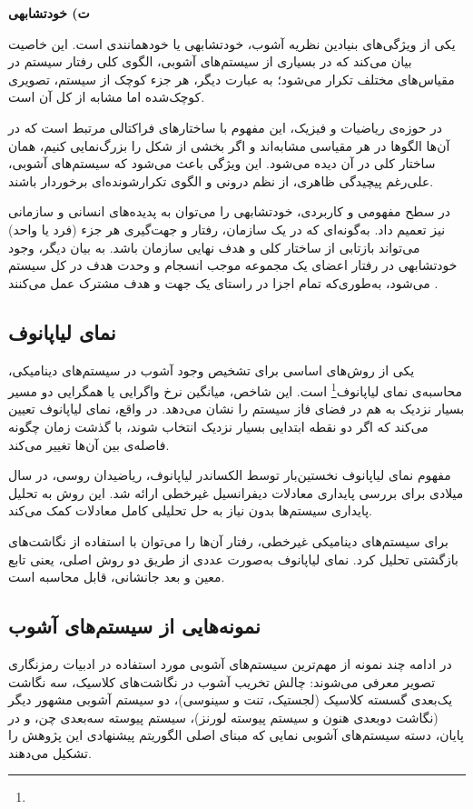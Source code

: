 \textbf{ت) خودتشابهی}

یکی از ویژگی‌های بنیادین نظریه آشوب، خودتشابهی یا خودهمانندی است. این خاصیت بیان می‌کند که در بسیاری از سیستم‌های آشوبی، الگوی کلی رفتار سیستم در مقیاس‌های مختلف تکرار می‌شود؛ به عبارت دیگر، هر جزء کوچک از سیستم، تصویری کوچک‌شده اما مشابه از کل آن است.

در حوزه‌ی ریاضیات و فیزیک، این مفهوم با ساختارهای فراکتالی مرتبط است که در آن‌ها الگوها در هر مقیاسی مشابه‌اند و اگر بخشی از شکل را بزرگ‌نمایی کنیم، همان ساختار کلی در آن دیده می‌شود. این ویژگی باعث می‌شود که سیستم‌های آشوبی، علی‌رغم پیچیدگی ظاهری، از نظم درونی و الگوی تکرارشونده‌ای برخوردار باشند.

در سطح مفهومی و کاربردی، خودتشابهی را می‌توان به پدیده‌های انسانی و سازمانی نیز تعمیم داد. به‌گونه‌ای که در یک سازمان، رفتار و جهت‌گیری هر جزء (فرد یا واحد) می‌تواند بازتابی از ساختار کلی و هدف نهایی سازمان باشد. به بیان دیگر، وجود خودتشابهی در رفتار اعضای یک مجموعه موجب انسجام و وحدت هدف در کل سیستم می‌شود، به‌طوری‌که تمام اجزا در راستای یک جهت و هدف مشترک عمل می‌کنند \cite{ref27}.

\subsection{نمای لیاپانوف}

یکی از روش‌های اساسی برای تشخیص وجود آشوب در سیستم‌های دینامیکی، محاسبه‌ی نمای لیاپانوف\footnote{} است. این شاخص، میانگین نرخ واگرایی یا همگرایی دو مسیر بسیار نزدیک به هم در فضای فاز سیستم را نشان می‌دهد. در واقع، نمای لیاپانوف تعیین می‌کند که اگر دو نقطه ابتدایی بسیار نزدیک انتخاب شوند، با گذشت زمان چگونه فاصله‌ی بین آن‌ها تغییر می‌کند.

مفهوم نمای لیاپانوف نخستین‌بار توسط الکساندر لیاپانوف، ریاضیدان روسی، در سال  میلادی برای بررسی پایداری معادلات دیفرانسیل غیرخطی ارائه شد. این روش به تحلیل پایداری سیستم‌ها بدون نیاز به حل تحلیلی کامل معادلات کمک می‌کند.

برای سیستم‌های دینامیکی غیرخطی، رفتار آن‌ها را می‌توان با استفاده از نگاشت‌های بازگشتی تحلیل کرد. نمای لیاپانوف به‌صورت عددی از طریق دو روش اصلی، یعنی تابع معین و بعد جانشانی، قابل محاسبه است.

\subsection{نمونه‌هایی از سیستم‌های آشوب}

در ادامه چند نمونه از مهم‌ترین سیستم‌های آشوبی مورد استفاده در ادبیات رمزنگاری تصویر معرفی می‌شوند: چالش تخریب آشوب در نگاشت‌های کلاسیک، سه نگاشت یک‌بعدی گسسته کلاسیک (لجستیک، تنت و سینوسی)، دو سیستم آشوبی مشهور دیگر (نگاشت دوبعدی هنون و سیستم پیوسته لورنز)، سیستم پیوسته سه‌بعدی چن، و در پایان، دسته سیستم‌های آشوبی نمایی که مبنای اصلی الگوریتم پیشنهادی این پژوهش را تشکیل می‌دهند.

